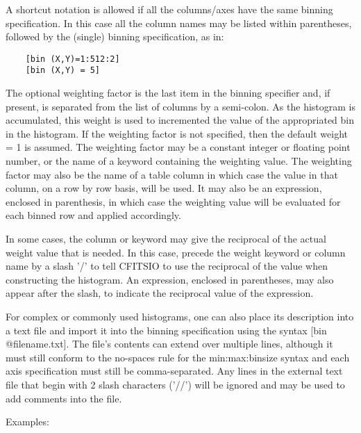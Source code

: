 \documentclass[11pt]{book}
\begin{document}
A shortcut notation is allowed if all the columns/axes have the same
binning specification.  In this case all the column names may be listed
within parentheses, followed by the (single) binning specification, as
in:

\begin{verbatim}
    [bin (X,Y)=1:512:2]
    [bin (X,Y) = 5]
\end{verbatim}

The optional weighting factor is the last item in the binning
specifier and, if present, is separated from the list of columns by a
semi-colon.  As the histogram is accumulated, this weight is used to
incremented the value of the appropriated bin in the histogram.  If
the weighting factor is not specified, then the default weight = 1 is
assumed.  The weighting factor may be a constant integer or floating
point number, or the name of a keyword containing the weighting value.
The weighting factor may also be the name of a table column in which
case the value in that column, on a row by row basis, will be used.
It may also be an expression, enclosed in parenthesis, in which case
the weighting value will be evaluated for each binned row and applied
accordingly.

In some cases, the column or keyword may give the reciprocal of the
actual weight value that is needed.  In this case, precede the weight
keyword or column name by a slash '/' to tell CFITSIO to use the
reciprocal of the value when constructing the histogram.  An expression,
enclosed in parentheses, may also appear after the slash, to
indicate the reciprocal value of the expression.

For complex or commonly used histograms, one can also place its
description into a text file and import it into the binning
specification using the syntax [bin @filename.txt].  The file's
contents can extend over multiple lines, although it must still
conform to the no-spaces rule for the min:max:binsize syntax and each
axis specification must still be comma-separated.  Any lines in the
external text file that begin with 2 slash characters ('//') will be
ignored and may be used to add comments into the file.

 Examples:
\end{document}
